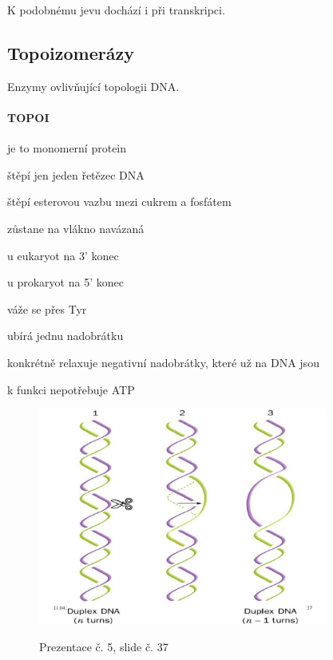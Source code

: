 \documentclass[DIV=8]{scrreprt}
\begin{document}
K podobnému jevu dochází i při transkripci.

\subsection{Topoizomerázy} \label{Topoizomerázy}


Enzymy ovlivňující topologii DNA.

\paragraph{TOPOI}
\begin{myItemize}[nosep]
    \item je to monomerní protein
    \item štěpí jen jeden řetězec DNA
\begin{myItemize}[nosep]
    \item štěpí esterovou vazbu mezi cukrem a fosfátem
    \item zůstane na vlákno navázaná
\begin{myItemize}[nosep]
    \item u eukaryot na 3' konec
    \item u prokaryot na 5' konec
\end{myItemize}

    \item váže se přes Tyr
\end{myItemize}

    \item ubírá jednu nadobrátku
\begin{myItemize}[nosep]
    \item konkrétně relaxuje negativní nadobrátky, které už na DNA jsou
\end{myItemize}

    \item k funkci nepotřebuje ATP
\end{myItemize}



\begin{figure}
    \caption{Prezentace č. 5, slide č. 37}
    \includegraphics[width=0.85\textwidth]{slides-5/slide-37.jpg}
    \centering
    \label{slides-5-slide-37}
\end{figure}
\end{document}
